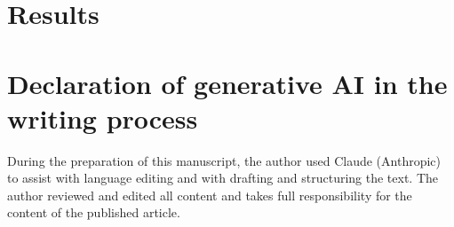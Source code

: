 \documentclass[11pt,a4paper]{article}
\begin{document}
\section{Results}
\label{sec:results-top}







\section*{Declaration of generative AI in the writing process}
During the preparation of this manuscript, the author used Claude (Anthropic) to assist with language editing and with drafting and structuring the text. The author reviewed and edited all content and takes full responsibility for the content of the published article.


\end{document}
